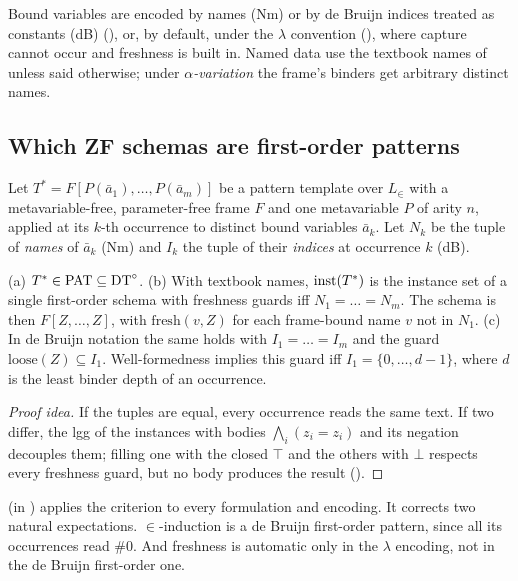 Bound variables are encoded by names (Nm) or by de Bruijn indices treated as constants (dB) (),
or, by default, under the $\lambda$ convention (), where capture cannot occur and freshness
is built in. Named data use the textbook names of  unless said otherwise; under
\emph{$\alpha$-variation} the frame's binders get arbitrary distinct names.

\subsection{Which ZF schemas are first-order patterns}\label{sec:zf:fo}

Let $T^*=F[P(\bar a_1),\dots,P(\bar a_m)]$ be a pattern template over $L_\in$ with a metavariable-free,
parameter-free frame $F$ and one metavariable $P$ of arity $n$, applied at its $k$-th occurrence to distinct bound
variables $\bar a_k$. Let $N_k$ be the tuple of \emph{names} of $\bar a_k$ (Nm) and $I_k$ the tuple of
their \emph{indices} at occurrence $k$ (dB).

\begin{theorem}[Classification]\label{thm:zf:classify}
(a) $T^*\in\mathrm{PAT}\subseteq\mathrm{DT}^{\circ}$.
(b) With textbook names, $\mathrm{inst}(T^*)$ is the instance set of a single first-order schema with freshness guards iff
$N_1=\dots=N_m$. The schema is then $F[Z,\dots,Z]$, with $\mathrm{fresh}(v,Z)$ for each frame-bound name $v$ not in
$N_1$.
(c) In de Bruijn notation the same holds with $I_1=\dots=I_m$ and the guard $\mathrm{loose}(Z)\subseteq I_1$.
Well-formedness implies this guard iff $I_1=\{0,\dots,d-1\}$, where $d$ is the least binder depth of an occurrence.
\end{theorem}
\begin{proof}[Proof idea]
If the tuples are equal, every occurrence reads the same text. If two differ, the lgg of the instances with bodies
$\bigwedge_i(z_i=z_i)$ and its negation decouples them; filling one with the closed $\top$ and the others with $\bot$
respects every freshness guard, but no body produces the result ().
\end{proof}
 (in ) applies the criterion to every formulation and encoding. It corrects
two natural expectations. $\in$-induction is a de Bruijn first-order pattern, since all its occurrences read $\#0$. And freshness is automatic only in the $\lambda$ encoding,
not in the de Bruijn first-order one.

